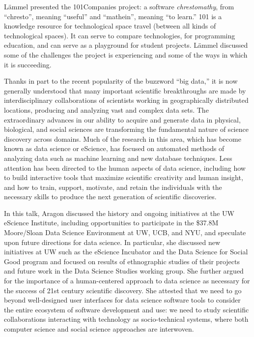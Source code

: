 \documentclass[a4paper,UKenglish]{dagrep}
\begin{document}

L\"ammel presented the 101Companies project: a software \emph{chrestomathy}, from ``chresto'', meaning ``useful'' and ``mathein'', meaning ``to learn.'' 101 is a knowledge resource for technological space travel (between all kinds of technological spaces). It can serve to compare technologies, for programming education, and can serve as a playground for student projects. L\"ammel discussed some of the challenges the project is experiencing and some of the ways in which it is succeeding. 


Thanks in part to the recent popularity of the buzzword ``big data,'' it is now generally understood that many important scientific breakthroughs are made by interdisciplinary collaborations of scientists working in geographically distributed locations, producing and analyzing vast and complex data sets. The extraordinary advances in our ability to acquire and generate data in physical, biological, and social sciences are transforming the fundamental nature of science discovery across domains. Much of the research in this area, which has become known as data science or eScience, has focused on automated methods of analyzing data such as machine learning and new database techniques. Less attention has been directed to the human aspects of data science, including how to build interactive tools that maximize scientific creativity and human insight, and how to train, support, motivate, and retain the individuals with the necessary skills to produce the next generation of scientific discoveries.

In this talk, Aragon discussed the history and ongoing initiatives at the UW eScience Institute, including opportunities to participate in the \$37.8M Moore/Sloan Data Science Environment at UW, UCB, and NYU, and speculate upon future directions for data science. In particular, she discussed new initiatives at UW such as the eScience Incubator and the Data Science for Social Good program and focused on results of ethnographic studies of their projects and future work in the Data Science Studies working group. She further argued for the importance of a human-centered approach to data science as necessary for the success of 21st century scientific discovery. She attested that we need to go beyond well-designed user interfaces for data science software tools to consider the entire ecosystem of software development and use: we need to study scientific collaborations interacting with technology as socio-technical systems, where both computer science and social science approaches are interwoven.
\end{document}
